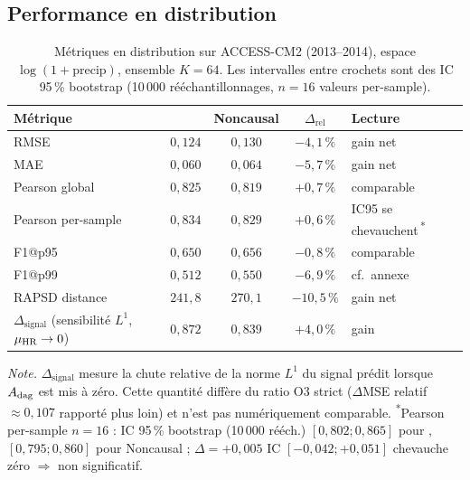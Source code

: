 \label{sec:exp-resultats}

\subsection{Performance en distribution}
\label{ssec:exp-res-id}

\begin{table}[ht]
  \centering
  \small
  \caption[Métriques en distribution]{Métriques en distribution sur ACCESS-CM2 (2013--2014), espace $\log(1 + \mathrm{precip})$, ensemble $K = 64$. Les intervalles entre crochets sont des IC 95\,\% bootstrap (10\,000 rééchantillonnages, $n=16$ valeurs per-sample).}
  \label{tab:exp-res-id}
  \begin{tabularx}{\linewidth}{l c c c X}
    \toprule
    \textbf{Métrique} & \Oracle{} & \textbf{Noncausal} & $\Delta_{\mathrm{rel}}$ & \textbf{Lecture} \\
    \midrule
    RMSE & $0{,}124$ & $0{,}130$ & $-4{,}1\,\%$ & gain net \\
    MAE & $0{,}060$ & $0{,}064$ & $-5{,}7\,\%$ & gain net \\
    Pearson global & $0{,}825$ & $0{,}819$ & $+0{,}7\,\%$ & comparable \\
    Pearson per-sample & $0{,}834$ & $0{,}829$ & $+0{,}6\,\%$ & IC95 se chevauchent\,\textsuperscript{*} \\
    F1@p95 & $0{,}650$ & $0{,}656$ & $-0{,}8\,\%$ & comparable \\
    F1@p99 & $0{,}512$ & $0{,}550$ & $-6{,}9\,\%$ & cf.~annexe \\
    RAPSD distance & $241{,}8$ & $270{,}1$ & $-10{,}5\,\%$ & gain net \\
    $\Delta_{\mathrm{signal}}$ (sensibilité $L^1$, $\mu_{\text{HR}} \to 0$) & $0{,}872$ & $0{,}839$ & $+4{,}0\,\%$ & gain \\
    \bottomrule
  \end{tabularx}
  \vspace{0.3em}
  \footnotesize
  \emph{Note.} $\Delta_{\mathrm{signal}}$ mesure la chute relative de la norme $L^1$ du signal prédit lorsque $A_{\mathrm{dag}}$ est mis à zéro. Cette quantité diffère du ratio O3 strict ($\Delta$MSE relatif $\approx 0{,}107$ rapporté plus loin) et n'est pas numériquement comparable. \textsuperscript{*}Pearson per-sample $n=16$ : IC 95\,\% bootstrap (10\,000 rééch.) $[0{,}802; 0{,}865]$ pour \Oracle{}, $[0{,}795; 0{,}860]$ pour Noncausal ; $\Delta = +0{,}005$ IC $[-0{,}042; +0{,}051]$ chevauche zéro $\Rightarrow$ non significatif.
\end{table}

